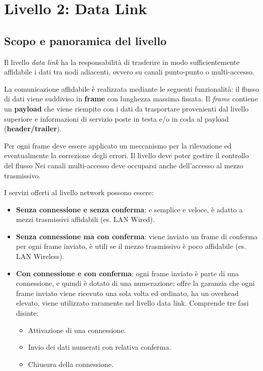 \section{Livello 2: Data Link}
    \subsection{Scopo e panoramica del livello}
        Il livello \textit{data link} ha la responsabilità di trasferire in modo sufficientemente affidabile i dati tra nodi adiacenti, ovvero su canali punto-punto o multi-accesso.

        La comunicazione affidabile è realizzata mediante le seguenti funzionalità: il flusso di dati viene suddiviso in \textbf{frame} con lunghezza massima fissata. Il \textit{frame} contiene un \textbf{payload} che viene riempito con i dati da trasportare provenienti dal livello superiore e informazioni di servizio poste in testa e/o in coda al payload (\textbf{header/trailer}).

        Per ogni frame deve essere applicato un meccanismo per la rilevazione ed eventualmente la correzione degli errori. Il livello deve poter gestire il controllo del flusso Nei canali multi-accesso deve occuparsi anche dell'accesso al mezzo trasmissivo.
        
        I servizi offerti al livello network possono essere:
        \begin{itemize}
            \item \textbf{Senza connessione e senza conferma}: e semplice e veloce, è adatto a mezzi trasmissivi affidabili (es. LAN Wired).
            \item \textbf{Senza connessione ma con conferma}: viene inviato un frame di conferma per ogni frame inviato, è utili se il mezzo trasmissivo è poco affidabile (es. LAN Wireless).
            \item \textbf{Con connessione e con conferma}: ogni frame inviato è parte di una connessione, e quindi è dotato di una numerazione; offre la garanzia che ogni frame inviato viene ricevuto una sola volta ed ordinato, ha un overhead elevato, viene utilizzato raramente nel livello data link. Comprende tre fasi disinte:
            \begin{itemize}
                \item Attivazione di una connessione.
                \item Invio dei dati numerati con relativa conferma.
                \item Chiusura della connessione.
            \end{itemize}
        \end{itemize}

